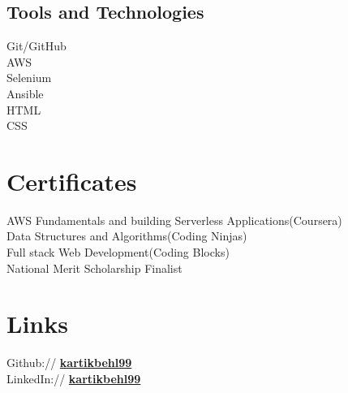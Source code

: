 \documentclass[]{main}
\begin{document}
\begin{minipage}[t]{0.33\textwidth}
\subsection{Tools and Technologies}
\textbullet{} Git/GitHub \\
\textbullet{} AWS \\
\textbullet{} Selenium \\
\textbullet{} Ansible \\
\textbullet{} HTML \\
\textbullet{} CSS \\
\sectionsep





\section{Certificates}
AWS Fundamentals and building Serverless Applications(Coursera)\\
Data Structures and Algorithms(Coding Ninjas)\\
Full stack Web Development(Coding Blocks)\\
National Merit Scholarship Finalist \\
\sectionsep


\section{Links}
Github:// \href{https://github.com/kartikbehl99}{\bf kartikbehl99} \\
LinkedIn://  \href{https://www.linkedin.com/in/kartik-behl-b46a3484/}{\bf kartikbehl99} \\
\sectionsep

\end{minipage}
\end{document}
